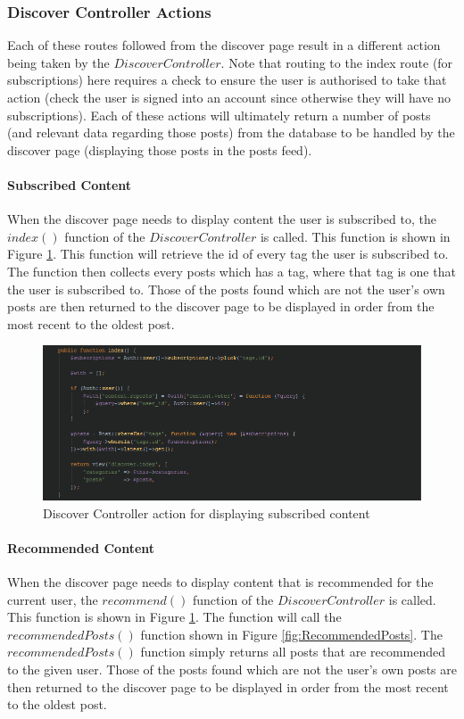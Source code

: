 \subsubsection{Discover Controller Actions}
Each of these routes followed from the discover page result in a different action being taken by the \(DiscoverController\). Note that routing to the index route (for subscriptions) here requires a check to ensure the user is authorised to take that action (check the user is signed into an account since otherwise they will have no subscriptions). Each of these actions will ultimately return a number of posts (and relevant data regarding those posts) from the database to be handled by the discover page (displaying those posts in the posts feed).

\paragraph{Subscribed Content}
When the discover page needs to display content the user is subscribed to, the \(index()\) function of the \(DiscoverController\) is called. This function is shown in Figure \ref{fig:DiscoverControllerSubscribed}. This function will retrieve the id of every tag the user is subscribed to. The function then collects every posts which has a tag, where that tag is one that the user is subscribed to. Those of the posts found which are not the user's own posts are then returned to the discover page to be displayed in order from the most recent to the oldest post.

\begin{figure}[H]
\centering
\includegraphics[width=\textwidth]{Images/Implementation/DiscoverControllerSubscribed}
\caption{Discover Controller action for displaying subscribed content}
\label{fig:DiscoverControllerSubscribed}
\end{figure}

\paragraph{Recommended Content}
When the discover page needs to display content that is recommended for the current user, the \(recommend()\) function of the \(Discover  Controller\) is called. This function is shown in Figure \ref{fig:DiscoverControllerSubscribed}. The function will call the \(recommendedPosts()\) function shown in Figure \ref{fig:RecommendedPosts}. The \(recommendedPosts()\) function simply returns all posts that are recommended to the given user. Those of the posts found which are not the user's own posts are then returned to the discover page to be displayed in order from the most recent to the oldest post.

